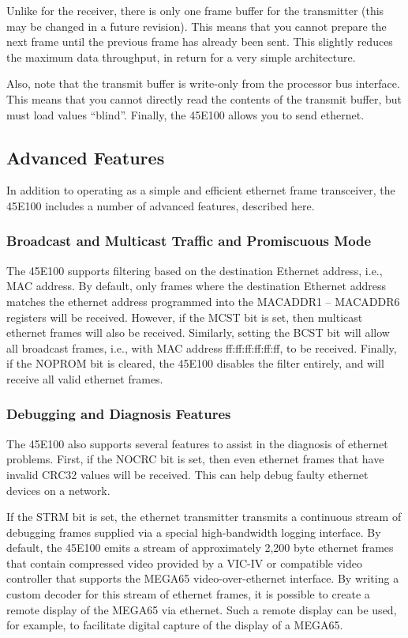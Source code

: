 Unlike for the receiver, there is only one frame buffer for the transmitter (this may be changed in
a future revision). This means that you cannot prepare the next frame until the previous frame has
already been sent.  This slightly reduces the maximum data throughput, in return for a very simple
architecture.

Also, note that the transmit buffer is write-only from the processor bus interface. This means that
you cannot directly read the contents of the transmit buffer, but must load values ``blind''.  Finally,
the 45E100 allows you to send ethernet.

\subsection{Advanced Features}

In addition to operating as a simple and efficient ethernet frame transceiver, the 45E100
includes a number of advanced features, described here.

\subsubsection{Broadcast and Multicast Traffic and Promiscuous Mode}

The 45E100 supports filtering based on the destination Ethernet address, i.e., MAC address.
By default, only frames where the destination Ethernet address matches the ethernet address
programmed into the MACADDR1 -- MACADDR6 registers will be received. However, if the MCST bit
is set, then multicast ethernet frames will also be received. Similarly, setting the BCST bit
will allow all broadcast frames, i.e., with MAC address ff:ff:ff:ff:ff:ff, to be received.
Finally, if the NOPROM bit is cleared, the 45E100 disables the filter entirely, and will
receive all valid ethernet frames.

\subsubsection{Debugging and Diagnosis Features}

The 45E100 also supports several features to assist in the diagnosis of ethernet problems.
First, if the NOCRC bit is set, then even ethernet frames that have invalid CRC32 values
will be received. This can help debug faulty ethernet devices on a network.

If the STRM bit is set, the ethernet transmitter transmits a continuous stream of debugging frames
supplied via a special high-bandwidth logging interface. By default, the 45E100 emits a
stream of approximately 2,200 byte ethernet frames that contain compressed video provided
by a VIC-IV or compatible video controller that supports the MEGA65 video-over-ethernet
interface.  By writing a custom decoder for this stream of ethernet frames, it is possible
to create a remote display of the MEGA65 via ethernet. Such a remote display can be used,
for example, to facilitate digital capture of the display of a MEGA65.

